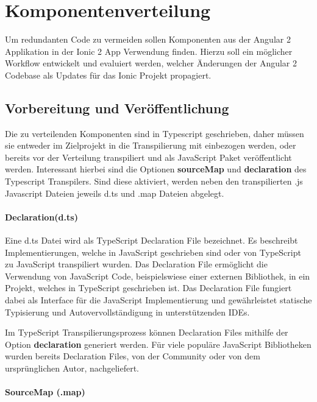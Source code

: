 \section{Komponentenverteilung}

Um redundanten Code zu vermeiden sollen Komponenten aus der Angular 2 Applikation in der Ionic 2 App Verwendung finden.
Hierzu soll ein möglicher Workflow entwickelt und evaluiert werden, welcher Änderungen
der Angular 2 Codebase als Updates für das Ionic Projekt propagiert.

\subsection{Vorbereitung und Veröffentlichung}

Die zu verteilenden Komponenten sind in Typescript geschrieben,
daher müssen sie entweder im Zielprojekt in die Transpilierung mit einbezogen werden,
oder bereits vor der Verteilung transpiliert und als JavaScript Paket veröffentlicht werden.
Interessant hierbei sind die Optionen \textbf{sourceMap} und \textbf{declaration} des Typescript Transpilers.
Sind diese aktiviert, werden neben den transpilierten .js Javascript Dateien jeweils d.ts und .map Dateien abgelegt.

\paragraph{Declaration(d.ts)}

Eine d.ts Datei wird als TypeScript Declaration File bezeichnet.
Es beschreibt Implementierungen, welche in JavaScript geschrieben sind oder von TypeScript zu JavaScript transpiliert wurden.
Das Declaration File ermöglicht die Verwendung von JavaScript Code, beispielswiese einer externen Bibliothek,
in ein Projekt, welches in TypeScript geschrieben ist. Das Declaration File fungiert dabei als Interface
für die JavaScript Implementierung und gewährleistet statische Typisierung
und Autovervollständigung in unterstützenden IDEs.

Im TypeScript Transpilierungsprozess können Declaration Files mithilfe der Option \textbf{declaration} generiert werden.
Für viele populäre JavaScript Bibliotheken wurden bereits Declaration Files, von der Community oder von dem ursprünglichen Autor, nachgeliefert.
\cite[471]{EssentialTS}

\paragraph{SourceMap (.map)}

